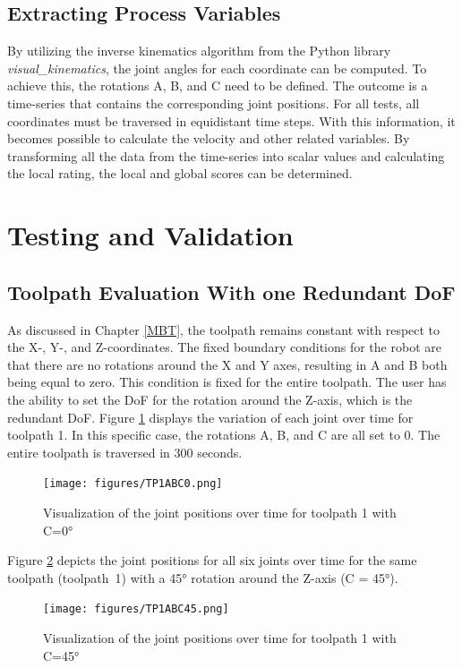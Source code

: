 \subsection{Extracting Process Variables}
By utilizing the inverse kinematics algorithm from the Python library \textit{visual\_kinematics}, the joint angles for each coordinate can be computed. To achieve this, the rotations A, B, and C need to be defined. The outcome is a time-series that contains the corresponding joint positions. For all tests, all coordinates must be traversed in equidistant time steps. With this information, it becomes possible to calculate the velocity and other related variables. By transforming all the data from the time-series into scalar values and calculating the local rating, the local and global scores can be determined.

\section{Testing and Validation}%

\subsection{Toolpath Evaluation With one Redundant DoF}
As discussed in Chapter \ref{MBT}, the toolpath remains constant with respect to the X-, Y-, and Z-coordinates. The fixed boundary conditions for the robot are that there are no rotations around the X and Y axes, resulting in A and B both being equal to zero. This condition is fixed for the entire toolpath. The user has the ability to set the \acrshort{DoF} for the rotation around the Z-axis, which is the redundant \acrshort{DoF}. Figure \ref{TP1ABC0} displays the variation of each joint over time for toolpath 1. In this specific case, the rotations A, B, and C are all set to 0. The entire toolpath is traversed in 300 seconds.

\begin{figure}[H]
	\centerline{\texttt{[image: figures/TP1ABC0.png]}}
	\caption{Visualization of the joint positions over time for toolpath 1 with C=0°}
	\label{TP1ABC0}
\end{figure}

Figure \ref{TP1ABC45} depicts the joint positions for all six joints over time for the same toolpath (toolpath~1) with a 45° rotation around the Z-axis (C = 45°). 
\begin{figure}[H]
	\centerline{\texttt{[image: figures/TP1ABC45.png]}}
	\caption{Visualization of the joint positions over time for toolpath 1 with C=45°}
	\label{TP1ABC45}
\end{figure}

